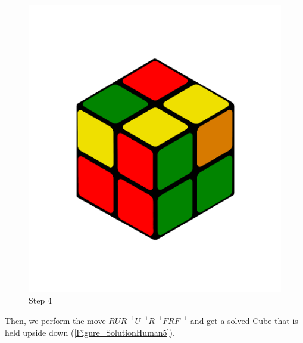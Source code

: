 \documentclass[12pt,a4paper]{article}
\theoremstyle{custom}
\begin{document}
\begin{figure}[H]
\centering
\includegraphics[scale=0.19]{Step4.png}
\caption{Step 4}
\label{Figure_SolutionHuman4}
\end{figure}

Then, we perform the move $\textit{RUR}^{-1}U^{-1} R^{-1}\textit{FRF}^{-1}$  and get a solved Cube that is held upside down (\ref{Figure_SolutionHuman5}).
\end{document}
